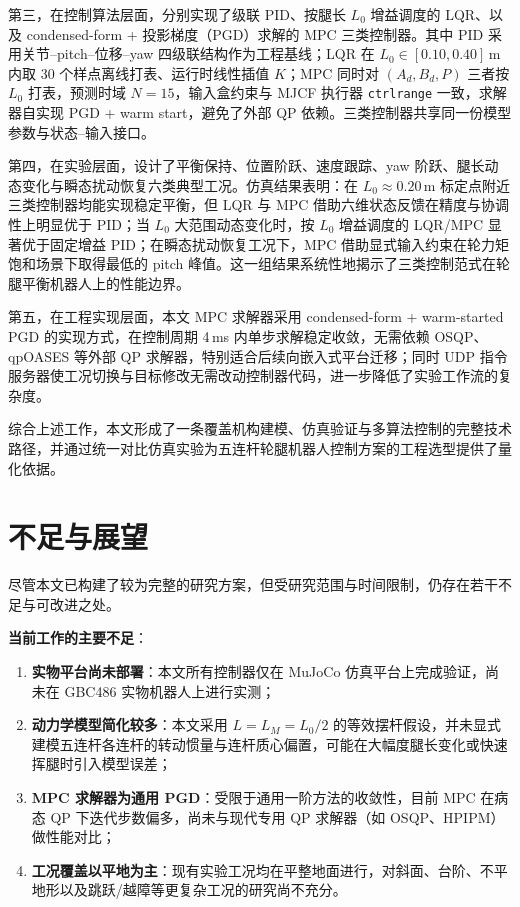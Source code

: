 \documentclass{smbuthesis}
\begin{document}
第三，在控制算法层面，分别实现了级联 PID、按腿长 $L_0$ 增益调度的 LQR、以及 condensed-form + 投影梯度（PGD）求解的 MPC 三类控制器。其中 PID 采用关节--pitch--位移--yaw 四级联结构作为工程基线；LQR 在 $L_0 \in [0.10, 0.40]\,\mathrm{m}$ 内取 30 个样点离线打表、运行时线性插值 $K$；MPC 同时对 $(A_d, B_d, P)$ 三者按 $L_0$ 打表，预测时域 $N = 15$，输入盒约束与 MJCF 执行器 \texttt{ctrlrange} 一致，求解器自实现 PGD + warm start，避免了外部 QP 依赖。三类控制器共享同一份模型参数与状态--输入接口。

第四，在实验层面，设计了平衡保持、位置阶跃、速度跟踪、yaw 阶跃、腿长动态变化与瞬态扰动恢复六类典型工况。仿真结果表明：在 $L_0 \approx 0.20\,\mathrm{m}$ 标定点附近三类控制器均能实现稳定平衡，但 LQR 与 MPC 借助六维状态反馈在精度与协调性上明显优于 PID；当 $L_0$ 大范围动态变化时，按 $L_0$ 增益调度的 LQR/MPC 显著优于固定增益 PID；在瞬态扰动恢复工况下，MPC 借助显式输入约束在轮力矩饱和场景下取得最低的 pitch 峰值。这一组结果系统性地揭示了三类控制范式在轮腿平衡机器人上的性能边界。

第五，在工程实现层面，本文 MPC 求解器采用 condensed-form + warm-started PGD 的实现方式，在控制周期 4\,ms 内单步求解稳定收敛，无需依赖 OSQP、qpOASES 等外部 QP 求解器，特别适合后续向嵌入式平台迁移；同时 UDP 指令服务器使工况切换与目标修改无需改动控制器代码，进一步降低了实验工作流的复杂度。

综合上述工作，本文形成了一条覆盖机构建模、仿真验证与多算法控制的完整技术路径，并通过统一对比仿真实验为五连杆轮腿机器人控制方案的工程选型提供了量化依据。

\section{不足与展望}

尽管本文已构建了较为完整的研究方案，但受研究范围与时间限制，仍存在若干不足与可改进之处。

\textbf{当前工作的主要不足}：

\begin{enumerate}
\item \textbf{实物平台尚未部署}：本文所有控制器仅在 MuJoCo 仿真平台上完成验证，尚未在 GBC486 实物机器人上进行实测；
\item \textbf{动力学模型简化较多}：本文采用 $L = L_M = L_0/2$ 的等效摆杆假设，并未显式建模五连杆各连杆的转动惯量与连杆质心偏置，可能在大幅度腿长变化或快速挥腿时引入模型误差；
\item \textbf{MPC 求解器为通用 PGD}：受限于通用一阶方法的收敛性，目前 MPC 在病态 QP 下迭代步数偏多，尚未与现代专用 QP 求解器（如 OSQP\cite{Stellato2020OSQP}、HPIPM）做性能对比；
\item \textbf{工况覆盖以平地为主}：现有实验工况均在平整地面进行，对斜面、台阶、不平地形以及跳跃/越障等更复杂工况的研究尚不充分。
\end{enumerate}
\end{document}
